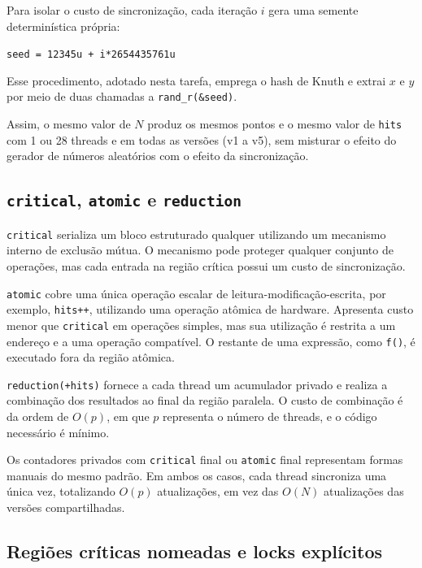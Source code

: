 \documentclass[11pt,letterpaper]{article}
\begin{document}
Para isolar o custo de sincronização, cada iteração $i$ gera uma semente
determinística própria:

\begin{center}
\texttt{seed = 12345u + i*2654435761u}
\end{center}

Esse procedimento, adotado nesta tarefa, emprega o hash
de Knuth e extrai $x$ e $y$ por meio de duas chamadas a
\texttt{rand\_r(\&seed)}.

Assim, o mesmo valor de $N$ produz os mesmos pontos e o mesmo valor de
\texttt{hits} com 1 ou 28 threads e em todas as versões (v1 a v5),
sem misturar o efeito do gerador de números aleatórios com o efeito da
sincronização.

\subsection{\texttt{critical}, \texttt{atomic} e \texttt{reduction}}

\texttt{critical} serializa um bloco estruturado qualquer utilizando
um mecanismo interno de exclusão mútua. O mecanismo pode proteger
qualquer conjunto de operações, mas cada entrada na região crítica
possui um custo de sincronização.

\texttt{atomic} cobre uma única operação escalar de
leitura-modificação-escrita, por exemplo, \texttt{hits++}, utilizando
uma operação atômica de hardware. Apresenta custo menor que
\texttt{critical} em operações simples, mas sua utilização é restrita
a um endereço e a uma operação compatível. O restante de uma expressão,
como \texttt{f()}, é executado fora da região atômica.

\texttt{reduction(+\:hits)} fornece a cada thread um acumulador privado
e realiza a combinação dos resultados ao final da região paralela.
O custo de combinação é da ordem de $O(p)$, em que $p$ representa o
número de threads, e o código necessário é mínimo.

Os contadores privados com \texttt{critical} final ou \texttt{atomic}
final representam formas manuais do mesmo padrão. Em ambos os casos,
cada thread sincroniza uma única vez, totalizando $O(p)$ atualizações,
em vez das $O(N)$ atualizações das versões compartilhadas.

\subsection{Regiões críticas nomeadas e locks explícitos}
\end{document}
